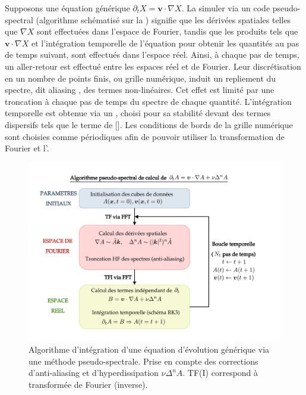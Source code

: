   Supposons une équation générique $\partial_t X = \boldsymbol{v} \cdot \nabla  X$. La simuler via un code pseudo-spectral (algorithme schématisé sur la ) signifie que les dérivées spatiales telles que $\nabla X$ sont effectuées dans l'espace de Fourier, tandis que les produits tels que $\boldsymbol{v} \cdot \nabla  X$  et l'intégration temporelle de l'équation pour obtenir les quantités au pas de temps suivant, sont effectués dans l'espace réel. Ainsi, à chaque pas de temps, un aller-retour est effectué entre les espaces réel et de Fourier. Leur discrétisation en un nombre de points finis, ou grille numérique, induit un repliement du spectre, dit \og aliasing \fg{}, des termes non-linéaires. Cet effet est limité par une troncation à chaque pas de temps du spectre de chaque quantité. L'intégration temporelle est obtenue via un , choisi pour sa stabilité devant des termes dispersifs tels que le terme de  [\cite{williamson_low-storage_1980}]. Les conditions de bords de la grille numérique sont choisies comme périodiques afin de pouvoir utiliser la transformation de Fourier et l'. 
 \begin{figure}[!ht]
 \centering
\includegraphics[width=0.9\linewidth,trim=1cm 1cm 3cm 1cm, clip=true]{./Mainmatter/Part_3/images_ch1/code_OCA}
\cprotect\caption{Algorithme d'intégration d'une équation d'évolution générique via une méthode pseudo-spectrale. Prise en compte des corrections d'anti-aliasing et d'hyperdissipation \ensuremath{\nu \Delta^n A}. TF(I) correspond à transformée de Fourier (inverse). }
\label{fig:algo_OCA}
\end{figure}

